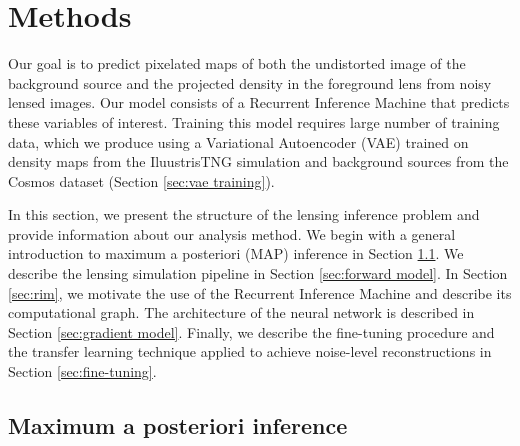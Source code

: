 \section{Methods}\label{sec:methods}
Our goal is to predict pixelated maps of both the undistorted image of the background source and the projected density in the foreground lens from noisy lensed images. Our model consists of a Recurrent Inference Machine that predicts these variables of interest. Training this model requires large number of training data, which we produce using a Variational Autoencoder (VAE) trained on density maps from the IluustrisTNG simulation and background sources from the Cosmos dataset (Section \ref{sec:vae training}).  

In this section, we present the structure of the lensing inference problem and provide information about our analysis method.
We begin with a general introduction to maximum a posteriori (MAP) inference in Section \ref{sec:maximum a posteriori}.
We describe the lensing simulation pipeline in Section \ref{sec:forward model}.
In Section \ref{sec:rim}, we motivate the use of the Recurrent Inference Machine and describe its  computational graph.
The architecture of the neural network is described in Section 
\ref{sec:gradient model}.  Finally, we describe the fine-tuning procedure and the transfer learning technique applied to achieve noise-level reconstructions in Section \ref{sec:fine-tuning}.


\subsection{Maximum a posteriori inference}\label{sec:maximum a posteriori}


